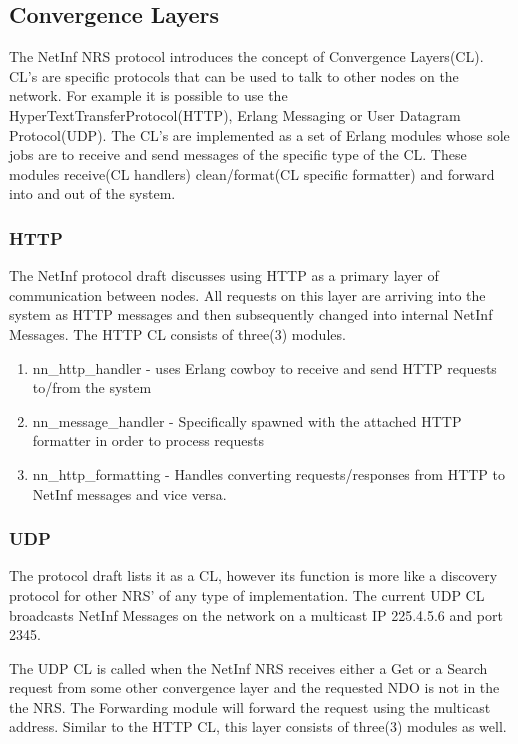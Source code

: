 \subsection {Convergence Layers}
\label{CL}
The NetInf NRS protocol introduces the concept of Convergence Layers(CL). CL's are specific protocols that can be used to talk to other nodes on the network. For example it is possible to use the HyperTextTransferProtocol(HTTP), Erlang Messaging or User Datagram Protocol(UDP). The CL's are implemented as a set of Erlang modules whose sole jobs are to receive and send messages of the specific type of the CL. These modules receive(CL handlers) clean/format(CL specific formatter) and forward into and out of the system.

\subsubsection{HTTP}

The NetInf protocol draft discusses using HTTP as a primary layer of communication between nodes. All requests on this layer are arriving into the system as HTTP messages and then subsequently changed into internal NetInf Messages. The HTTP CL consists of three(3) modules. 

\begin{enumerate}
\item nn\_http\_handler - uses Erlang cowboy to receive and send HTTP requests to/from the system
\item nn\_message\_handler - Specifically spawned with the attached HTTP formatter in order to process requests
\item nn\_http\_formatting - Handles converting requests/responses from HTTP to NetInf messages and vice versa.
\end{enumerate}

\subsubsection{UDP}

The protocol draft lists it as a CL, however its function is more like a discovery protocol for other NRS' of any type of implementation. The current UDP CL broadcasts NetInf Messages on the network on a multicast IP 225.4.5.6 and port 2345. 

The UDP CL is called when the NetInf NRS receives either a Get or a Search request from some other convergence layer and the requested NDO is not in the the NRS. The Forwarding module will forward the request using the multicast address. Similar to the HTTP CL, this layer consists of three(3) modules as well. 

